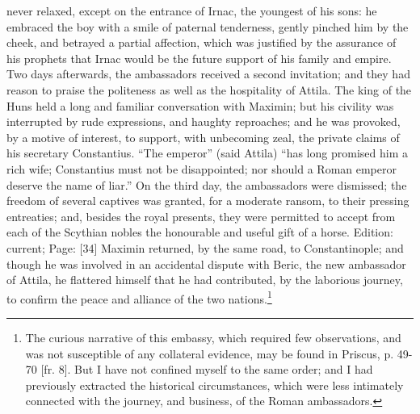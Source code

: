 never relaxed, except on the entrance of Irnac, the youngest of his sons: he embraced the boy with a smile of paternal tenderness, gently pinched him by the cheek, and betrayed a partial affection, which was justified by the assurance of his prophets that Irnac would be the future support of his family and empire. Two days afterwards, the ambassadors received a second invitation; and they had reason to praise the politeness as well as the hospitality of Attila. The king of the Huns held a long and familiar conversation with Maximin; but his civility was interrupted by rude expressions, and haughty reproaches; and he was provoked, by a motive of interest, to support, with unbecoming zeal, the private claims of his secretary Constantius. \texthebrew{“}The emperor\texthebrew{}” (said Attila) \texthebrew{“}has long promised him a rich wife; Constantius must not be disappointed; nor should a Roman emperor deserve the name of liar.\texthebrew{}” On the third day, the ambassadors were dismissed; the freedom of several captives was granted, for a moderate ransom, to their pressing entreaties; and, besides the royal presents, they were permitted to accept from each of the Scythian nobles the honourable and useful gift of a horse. Edition: current; Page: [34] Maximin returned, by the same road, to Constantinople; and though he was involved in an accidental dispute with Beric, the new ambassador of Attila, he flattered himself that he had contributed, by the laborious journey, to confirm the peace and alliance of the two nations.\footnote{The curious narrative of this embassy, which required few observations, and was not susceptible of any collateral evidence, may be found in Priscus, p. 49-70 [fr. 8]. But I have not confined myself to the same order; and I had previously extracted the historical circumstances, which were less intimately connected with the journey, and business, of the Roman ambassadors.}


